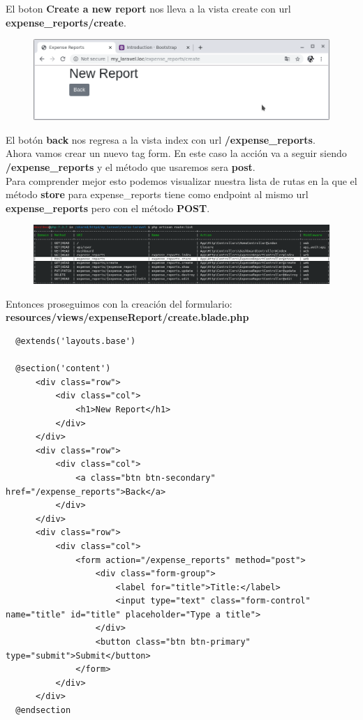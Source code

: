 \documentclass{article}
\begin{document}
El boton \textbf{Create a new report} nos lleva a la vista create con url
\textbf{expense\_reports/create}.

\newpage

\begin{figure}[h!]
  \centering
  \includegraphics[scale=0.5]{./Pictures/056_new_report_btn_back.png}
\end{figure}

El botón \textbf{back} nos regresa a la vista index con url
\textbf{/expense\_reports}.\\

Ahora vamos crear un nuevo tag form. En este caso la acción va a seguir siendo
\textbf{/expense\_reports} y el método que usaremos sera \textbf{post}.\\

Para comprender mejor esto podemos visualizar nuestra lista de rutas en la que
el método \textbf{store} para expense\_reports tiene como endpoint al mismo url
\textbf{expense\_reports} pero con el método \textbf{POST}.\\

\begin{figure}[h!]
  \centering
  \includegraphics[scale=0.5]{./Pictures/057_store_post.png}
\end{figure}

Entonces proseguimos con la creación del formulario:\\

\textbf{resources/views/expenseReport/create.blade.php}
\begin{verbatim}
  @extends('layouts.base')

  @section('content')
      <div class="row">
          <div class="col">
              <h1>New Report</h1>
          </div>
      </div>
      <div class="row">
          <div class="col">
              <a class="btn btn-secondary" href="/expense_reports">Back</a>
          </div>
      </div>
      <div class="row">
          <div class="col">
              <form action="/expense_reports" method="post">
                  <div class="form-group">
                      <label for="title">Title:</label>
                      <input type="text" class="form-control" name="title" id="title" placeholder="Type a title">
                  </div>
                  <button class="btn btn-primary" type="submit">Submit</button>
              </form>
          </div>
      </div>
  @endsection
\end{verbatim}
\end{document}
